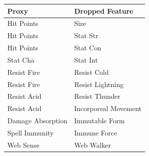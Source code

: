 \documentclass{article}
\begin{document}
\begin{table}[!htbp] \centering 
	\caption{Dropped highly correlated features and their proxy}
	\label{tab:dropped-features}
	
\begin{longtable}[]{@{}ll@{}}
	\toprule
	Proxy & Dropped Feature \\
	\midrule
	\endhead
	Hit Points & Size \\
	Hit Points & Stat Str \\
	Hit Points & Stat Con \\
	Stat Cha & Stat Int \\
	Resist Fire & Resist Cold \\
	Resist Fire & Resist Lightning \\
	Resist Acid & Resist Thunder \\
	Resist Acid & Incorporeal Movement \\
	Damage Absorption & Immutable Form \\
	Spell Immunity & Immune Force \\
	Web Sense & Web Walker \\
	\bottomrule
\end{longtable}

\end{table}
\end{document}
